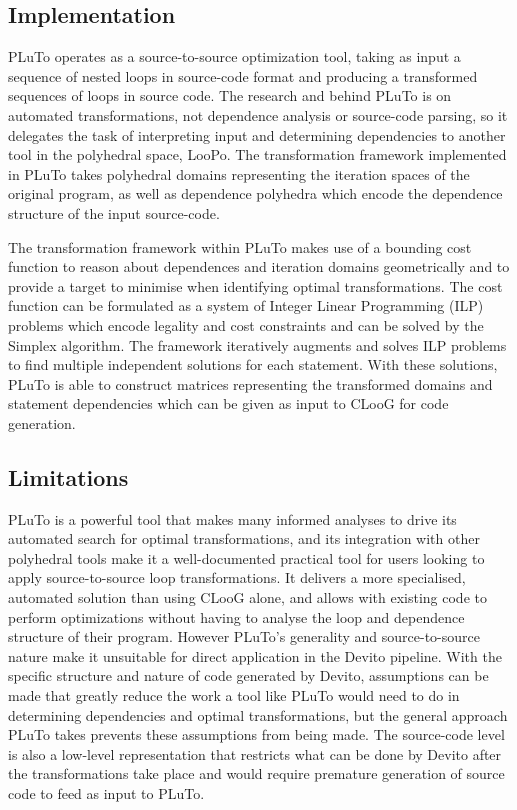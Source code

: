 \documentclass[a4paper,12pt,twoside]{report}
\begin{document}
\subsection{Implementation}
PLuTo operates as a source-to-source optimization tool, taking as input a sequence of nested loops in source-code format
and producing a transformed sequences of loops in source code. The research and behind PLuTo is on automated transformations,
not dependence analysis or source-code parsing, so it delegates the task of interpreting input and determining dependencies
to another tool in the polyhedral space, LooPo. The transformation framework implemented in PLuTo takes polyhedral domains representing the iteration
spaces of the original program, as well as dependence polyhedra which encode the dependence structure of the input source-code.

The transformation framework within PLuTo makes use of a bounding cost function to reason about dependences and iteration domains
geometrically and to provide a target to minimise when identifying optimal transformations. The cost function can be formulated
as a system of Integer Linear Programming (ILP) problems which encode legality and cost constraints and can be solved by the Simplex
algorithm. The framework iteratively augments and solves ILP problems to find multiple independent solutions for each statement. With
these solutions, PLuTo is able to construct matrices representing the transformed domains and statement dependencies which can be
given as input to CLooG for code generation.

\subsection{Limitations}
PLuTo is a powerful tool that makes many informed analyses to drive its automated search for optimal transformations, and its integration
with other polyhedral tools make it a well-documented practical tool for users looking to apply source-to-source loop transformations. It
delivers a more specialised, automated solution than using CLooG alone, and allows with existing code to perform optimizations without having to 
analyse the loop and dependence structure of their program. However
PLuTo's generality and source-to-source nature make it unsuitable for direct application in the Devito pipeline. With the specific structure and
nature of code generated by Devito, assumptions can be made that greatly reduce the work a tool like PLuTo would need to do in determining
dependencies and optimal transformations, but the general approach PLuTo takes prevents these assumptions from being made. The source-code level
is also a low-level representation that restricts what can be done by Devito after the transformations take place and would require premature
generation of source code to feed as input to PLuTo.
\end{document}
